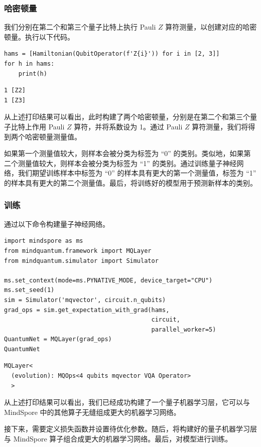 \subsubsection{哈密顿量}
我们分别在第二个和第三个量子比特上执行 Pauli $Z$ 算符测量，以创建对应的哈密顿量。执行以下代码。

\begin{lstlisting}
hams = [Hamiltonian(QubitOperator(f'Z{i}')) for i in [2, 3]]
for h in hams:
    print(h)
\end{lstlisting}

\begin{lstlisting}
1 [Z2]
1 [Z3]
\end{lstlisting}

从上述打印结果可以看出，此时构建了两个哈密顿量，分别是在第二个和第三个量子比特上作用 Pauli $Z$ 算符，并将系数设为 1。通过 Pauli $Z$ 算符测量，我们将得到两个哈密顿量测量值。

如果第一个测量值较大，则样本会被分类为标签为 ``0'' 的类别。类似地，如果第二个测量值较大，则样本会被分类为标签为 ``1'' 的类别。通过训练量子神经网络，我们期望训练样本中标签为 ``0'' 的样本具有更大的第一个测量值，标签为 ``1'' 的样本具有更大的第二个测量值。最后，将训练好的模型用于预测新样本的类别。

\subsubsection{训练}
通过以下命令构建量子神经网络。

\begin{lstlisting}
import mindspore as ms
from mindquantum.framework import MQLayer
from mindquantum.simulator import Simulator

ms.set_context(mode=ms.PYNATIVE_MODE, device_target="CPU")
ms.set_seed(1)
sim = Simulator('mqvector', circuit.n_qubits)
grad_ops = sim.get_expectation_with_grad(hams,
                                         circuit,
                                         parallel_worker=5)
QuantumNet = MQLayer(grad_ops)
QuantumNet
\end{lstlisting}

\begin{lstlisting}
MQLayer<
  (evolution): MQOps<4 qubits mqvector VQA Operator>
  >
\end{lstlisting}

从上述打印结果可以看出，我们已经成功构建了一个量子机器学习层，它可以与 MindSpore 中的其他算子无缝组成更大的机器学习网络。

接下来，需要定义损失函数并设置待优化参数。随后，将构建好的量子机器学习层与 MindSpore 算子组合成更大的机器学习网络。最后，对模型进行训练。%

